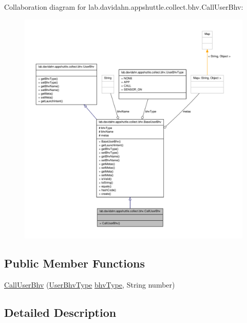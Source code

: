 \-Collaboration diagram for lab.\-davidahn.\-appshuttle.\-collect.\-bhv.\-Call\-User\-Bhv\-:
\nopagebreak
\begin{figure}[H]
\begin{center}
\leavevmode
\includegraphics[width=350pt]{classlab_1_1davidahn_1_1appshuttle_1_1collect_1_1bhv_1_1_call_user_bhv__coll__graph}
\end{center}
\end{figure}
\subsection*{\-Public \-Member \-Functions}
\begin{DoxyCompactItemize}
\item 
\hyperlink{classlab_1_1davidahn_1_1appshuttle_1_1collect_1_1bhv_1_1_call_user_bhv_a0428868e5cf2a0ec96719731aca8d881}{\-Call\-User\-Bhv} (\hyperlink{enumlab_1_1davidahn_1_1appshuttle_1_1collect_1_1bhv_1_1_user_bhv_type}{\-User\-Bhv\-Type} \hyperlink{classlab_1_1davidahn_1_1appshuttle_1_1collect_1_1bhv_1_1_base_user_bhv_a29dae66ba4bf89a75849d77a35a57cb2}{bhv\-Type}, \-String number)
\end{DoxyCompactItemize}


\subsection{\-Detailed \-Description}


